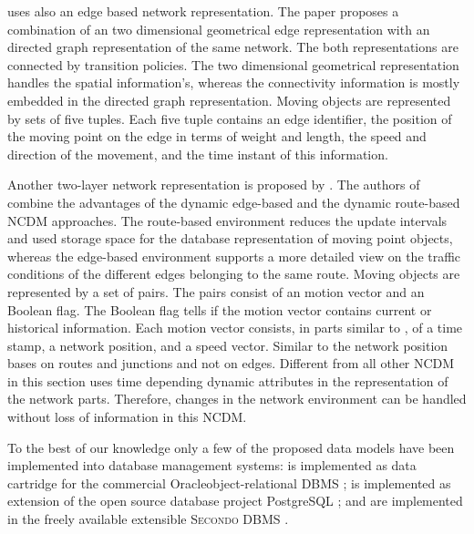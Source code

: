 \documentclass[a4paper]{article}
\newcommand{\secondo}{\textsc{Secondo}}
\begin{document}
\cite{NetworkJensen} uses also an edge based network representation. The paper
proposes a combination of an two dimensional geometrical edge representation with
an directed graph representation of the same network. The both representations
are connected by transition policies. The two dimensional
geometrical representation handles the spatial information's, whereas the
connectivity
information is mostly embedded in the directed graph representation.
Moving objects are represented by sets of five tuples. Each five tuple contains
an edge identifier, the position of the moving point on the edge
in terms of weight and length, the speed and direction of the movement, and
the time instant of this information.

Another two-layer network representation is proposed by
\cite{DynamicTransportNetworkDing}.
The authors of \cite{DynamicTransportNetworkDing} combine the advantages of the
dynamic edge-based \cite{DynNetworkModEdgeGueting} and the dynamic route-based
\cite{DynNetworkModRouteGueting} NCDM approaches. The route-based environment
reduces the update intervals and used storage space for the database representation
of moving point objects, whereas the edge-based environment supports
a more detailed view on the traffic conditions of the different edges belonging
to the same route. Moving objects are represented by a set of pairs. The pairs
consist of an motion vector and an Boolean flag. The Boolean flag tells if the
motion vector contains current or historical information. Each motion vector
consists, in parts similar to \cite{NetworkJensen}, of a time stamp, a network
position, and a speed vector. Similar to \cite{NetworkGueting} the network
position bases on routes and junctions and not on edges. Different from all
other NCDM in this section \cite{DynamicTransportNetworkDing}
uses time depending dynamic attributes in the representation of the network parts.
Therefore, changes in the network environment can be handled without loss of
information in this NCDM.

To the best of our knowledge only a few of the proposed data models have been
implemented into database management systems: \cite{STAUPelekis} is implemented
as data cartridge \cite{HERMESMDCPelekis, HERMESPelekis} for the commercial
Oracle\textregistered object-relational DBMS \cite{oracle};
\cite{DynamicTransportNetworkDing} is implemented as extension of the open source
database project PostgreSQL \cite{PostgreSQL}; \cite{DataModelDataStructureGueting}
and \cite{NetworkGueting} are implemented in the freely available extensible
\secondo{} DBMS \cite{SecondoPlatformPrototypingGueting}.
\end{document}
